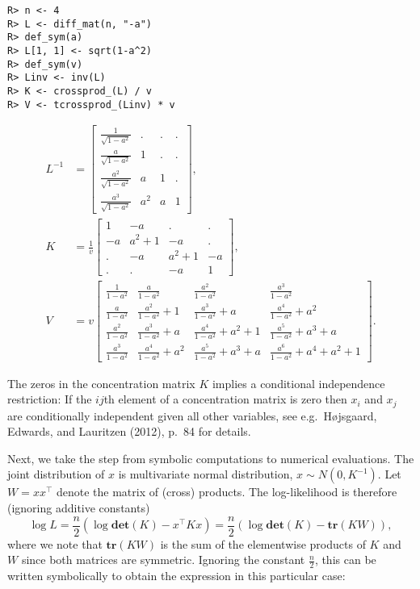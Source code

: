 \begin{verbatim}
R> n <- 4
R> L <- diff_mat(n, "-a")
R> def_sym(a)
R> L[1, 1] <- sqrt(1-a^2)
R> def_sym(v)
R> Linv <- inv(L)
R> K <- crossprod_(L) / v
R> V <- tcrossprod_(Linv) * v
\end{verbatim}

\begin{align} 
    L^{-1} &= \left[\begin{matrix}\frac{1}{\sqrt{1 - a^{2}}} & . & . & .\\\frac{a}{\sqrt{1 - a^{2}}} & 1 & . & .\\\frac{a^{2}}{\sqrt{1 - a^{2}}} & a & 1 & .\\\frac{a^{3}}{\sqrt{1 - a^{2}}} & a^{2} & a & 1\end{matrix}\right] , \\ 
    K &= \frac{1}{v}  \left[\begin{matrix}1 & - a & . & .\\- a & a^{2} + 1 & - a & .\\. & - a & a^{2} + 1 & - a\\. & . & - a & 1\end{matrix}\right] , \\ 
    V &= v  \left[\begin{matrix}\frac{1}{1 - a^{2}} & \frac{a}{1 - a^{2}} & \frac{a^{2}}{1 - a^{2}} & \frac{a^{3}}{1 - a^{2}}\\\frac{a}{1 - a^{2}} & \frac{a^{2}}{1 - a^{2}} + 1 & \frac{a^{3}}{1 - a^{2}} + a & \frac{a^{4}}{1 - a^{2}} + a^{2}\\\frac{a^{2}}{1 - a^{2}} & \frac{a^{3}}{1 - a^{2}} + a & \frac{a^{4}}{1 - a^{2}} + a^{2} + 1 & \frac{a^{5}}{1 - a^{2}} + a^{3} + a\\\frac{a^{3}}{1 - a^{2}} & \frac{a^{4}}{1 - a^{2}} + a^{2} & \frac{a^{5}}{1 - a^{2}} + a^{3} + a & \frac{a^{6}}{1 - a^{2}} + a^{4} + a^{2} + 1\end{matrix}\right]  .
  \end{align}

The zeros in the concentration matrix \(K\) implies a conditional
independence restriction: If the \(ij\)th element of a concentration
matrix is zero then \(x_i\) and \(x_j\) are conditionally independent
given all other variables, see e.g.~Højsgaard, Edwards, and Lauritzen (2012), p.~84 for
details.

Next, we take the step from symbolic computations to numerical
evaluations. The joint distribution of \(x\) is multivariate normal
distribution, \(x\sim N(0, K^{-1})\). Let \(W=x x^\top\) denote the
matrix of (cross) products. The log-likelihood is therefore (ignoring
additive constants)
\[ 
\log L = \frac n 2 (\log \mathbf{det}(K) - x^\top K x) = \frac n 2 (\log \mathbf{det}(K) - \mathbf{tr}(K W)), 
\]
where we note that \(\mathbf{tr}(KW)\) is the
sum of the elementwise products of \(K\) and \(W\) since both matrices are
symmetric. Ignoring the constant \(\frac n 2\),
this can be written symbolically to obtain the expression in
this particular case:

